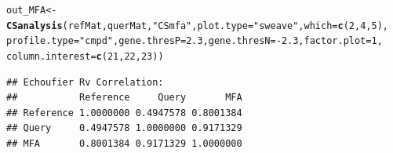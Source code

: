 \documentclass[a4paper]{article}\usepackage[]{graphicx}\usepackage[]{color}
\makeatletter
\newcommand{\hlnum}[1]{\textcolor[rgb]{0.686,0.059,0.569}{#1}}%
\newcommand{\hlstr}[1]{\textcolor[rgb]{0.192,0.494,0.8}{#1}}%
\newcommand{\hlopt}[1]{\textcolor[rgb]{0,0,0}{#1}}%
\newcommand{\hlstd}[1]{\textcolor[rgb]{0.345,0.345,0.345}{#1}}%
\newcommand{\hlkwb}[1]{\textcolor[rgb]{0.69,0.353,0.396}{#1}}%
\newcommand{\hlkwc}[1]{\textcolor[rgb]{0.333,0.667,0.333}{#1}}%
\newcommand{\hlkwd}[1]{\textcolor[rgb]{0.737,0.353,0.396}{\textbf{#1}}}%
\newenvironment{kframe}{%
 \def\at@end@of@kframe{}%
 \ifinner\ifhmode%
  \def\at@end@of@kframe{\end{minipage}}%
  \begin{minipage}{\columnwidth}%
 \fi\fi%
 \def\FrameCommand##1{\hskip\@totalleftmargin \hskip-\fboxsep
 \colorbox{shadecolor}{##1}\hskip-\fboxsep
     \hskip-\linewidth \hskip-\@totalleftmargin \hskip\columnwidth}%
 \MakeFramed {\advance\hsize-\width
   \@totalleftmargin\z@ \linewidth\hsize
   \@setminipage}}%
 {\par\unskip\endMakeFramed%
 \at@end@of@kframe}
\newenvironment{knitrout}{}{} %
\makeatother
\begin{document}
\begin{knitrout}
\color{fgcolor}\begin{kframe}
\begin{alltt}
\hlstd{out_MFA} \hlkwb{<-} \hlkwd{CSanalysis}\hlstd{(refMat,querMat,}\hlstr{"CSmfa"}\hlstd{,}\hlkwc{plot.type}\hlstd{=}\hlstr{"sweave"}\hlstd{,}\hlkwc{which}\hlstd{=}\hlkwd{c}\hlstd{(}\hlnum{2}\hlstd{,}\hlnum{4}\hlstd{,}\hlnum{5}\hlstd{),}
                \hlkwc{profile.type}\hlstd{=}\hlstr{"cmpd"}\hlstd{,}\hlkwc{gene.thresP}\hlstd{=}\hlnum{2.3}\hlstd{,}\hlkwc{gene.thresN}\hlstd{=}\hlopt{-}\hlnum{2.3}\hlstd{,}\hlkwc{factor.plot}\hlstd{=}\hlnum{1}\hlstd{,}
                \hlkwc{column.interest}\hlstd{=}\hlkwd{c}\hlstd{(}\hlnum{21}\hlstd{,}\hlnum{22}\hlstd{,}\hlnum{23}\hlstd{))}
\end{alltt}
\begin{verbatim}
## Echoufier Rv Correlation:
##           Reference     Query       MFA
## Reference 1.0000000 0.4947578 0.8001384
## Query     0.4947578 1.0000000 0.9171329
## MFA       0.8001384 0.9171329 1.0000000
\end{verbatim}
\end{kframe}\begin{figure}[H]



\end{figure}
\end{knitrout}
\end{document}
